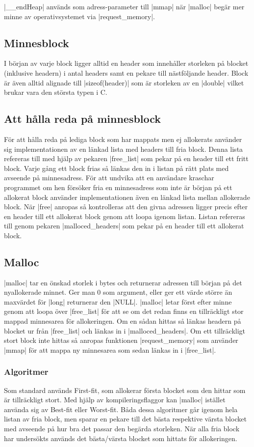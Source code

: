 \documentclass[paper=a4, fontsize=11pt]{scrartcl} %
\numberwithin{equation}{section} %
\numberwithin{figure}{section} %
\numberwithin{table}{section} %
\begin{document}
|__endHeap| används som adress-parameter till |mmap| när |malloc| begär 
mer minne av operativsystemet via |request_memory|.

\subsection{Minnesblock}
I början av varje block ligger alltid en header som innehåller storleken på
blocket (inklusive headern) i antal headers samt en pekare till nästföljande
header.
Block är även alltid alignade till |sizeof(header)| som är storleken av en
|double| vilket brukar vara den största typen i C.

\subsection{Att hålla reda på minnesblock}

För att hålla reda på lediga block som har mappats men ej allokerats använder
sig implementationen av en länkad lista med headers till fria block.
Denna lista refereras till med hjälp av pekaren |free_list| som pekar på en
header till ett fritt block.
Varje gång ett block frias så länkas den in i listan på rätt plats med avseende
på minnesadress.
För att undvika att en användare kraschar programmet om hen försöker fria en
minnesadress som inte är början på ett allokerat block använder
implementationen även en länkad lista mellan allokerade block.
När |free| anropas så kontrolleras att den givna adressen ligger precis efter
en header till ett allokerat block genom att loopa igenom listan.
Listan refereras till genom pekaren |malloced_headers| som pekar på en header
till ett allokerat block.

\subsection{Malloc}
|malloc| tar en önskad storlek i bytes och returnerar adressen till början på
det nyallokerade minnet.
Ger man 0 som argument, eller ger ett värde större än maxvärdet för |long|
returnerar den |NULL|.
|malloc| letar först efter minne genom att loopa över |free_list| för att se om
det redan finns en tillräckligt stor mappad minnesarea för allokeringen.
Om en sådan hittas så länkas headern på blocket ur från |free_list| och länkas
in i |malloced_headers|.
Om ett tillräckligt stort block inte hittas så anropas funktionen
|request_memory| som använder |mmap| för att mappa ny minnesarea som sedan
länkas in i |free_list|.
\subsubsection{Algoritmer}
Som standard används First-fit, som allokerar första blocket som den hittar
som är tillräckligt stort.
Med hjälp av kompileringsflaggor kan |malloc| istället använda sig av Best-fit
eller Worst-fit.
Båda dessa algoritmer går igenom hela listan av fria block, men sparar en
pekare till det bästa respektive värsta blocket med avseende på hur bra det
passar den begärda storleken.
När alla fria block har undersökts används det bästa/värsta blocket som hittats
för allokeringen.
\end{document}
